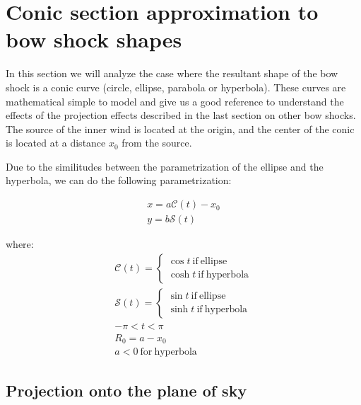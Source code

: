 \section{Conic section approximation to bow shock shapes}
\label{sec:conic}

\newcommand\Sin{\ensuremath{\mathcal{S}}}
\newcommand\Cos{\ensuremath{\mathcal{C}}}
\newcommand\Cot{\ensuremath{\mathcal{T}}}

In this section we will analyze the case where the resultant shape  of the bow shock is a conic curve (circle, ellipse, parabola or hyperbola).
These curves are mathematical simple to model and give us a good reference to understand the effects of the projection effects
described in the last section on other bow shocks. The source of the inner wind is located at the origin, and the center of the conic is located at
a distance $x_0$ from the source.

Due to the similitudes between the parametrization of the ellipse and the hyperbola, we can do the following parametrization:

\begin{align}
x = a\Cos(t)-x_0 \\ 
y = b\Sin(t)
\end{align}

where:
\begin{align}
\Cos(t) = \left\lbrace \begin{array}{c}
\cos t ~\mathrm{if~ellipse} \\
\cosh t ~\mathrm{if~hyperbola}
\end{array}\right.\\
\Sin(t) = \left\lbrace \begin{array}{c}
\sin t ~\mathrm{if~ellipse} \\
\sinh t ~\mathrm{if~hyperbola}
\end{array}\right. \\
-\pi < t < \pi \\
R_0 = a - x_0 \\
a<0 ~ \mathrm{for~hyperbola}
\end{align}

\subsection{Projection onto the plane of sky} 

